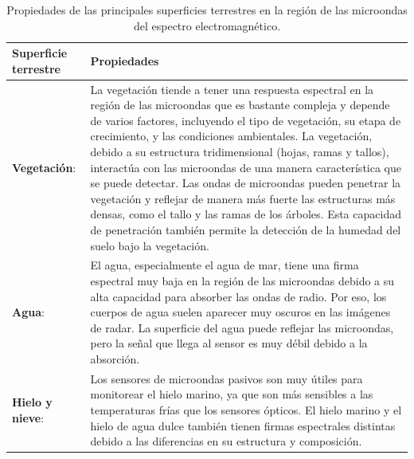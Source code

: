 \begin{table}[H]
    \caption{Propiedades de las principales superficies terrestres en la región de las microondas del espectro electromagnético.}
    \small
    \begin{tabularx}{1\textwidth}{lX}
        \hline
        \textbf{Superficie terrestre} & \textbf{Propiedades}                                                                                                                                                                                                                                                                                                                                                                                                                                                                                                                                                                                                                                                    \\ \hline
        \textbf{Vegetación}:          & La vegetación tiende a tener una respuesta espectral en la región de las microondas que es bastante compleja y depende de varios factores, incluyendo el tipo de vegetación, su etapa de crecimiento, y las condiciones ambientales. La vegetación, debido a su estructura tridimensional (hojas, ramas y tallos), interactúa con las microondas de una manera característica que se puede detectar. Las ondas de microondas pueden penetrar la vegetación y reflejar de manera más fuerte las estructuras más densas, como el tallo y las ramas de los árboles. Esta capacidad de penetración también permite la detección de la humedad del suelo bajo la vegetación.
        \\  \hline
        \textbf{Agua}:                & El agua, especialmente el agua de mar, tiene una firma espectral muy baja en la región de las microondas debido a su alta capacidad para absorber las ondas de radio. Por eso, los cuerpos de agua suelen aparecer muy oscuros en las imágenes de radar. La superficie del agua puede reflejar las microondas, pero la señal que llega al sensor es muy débil debido a la absorción.                                                                                                                                                                                                                                                                                    \\  \hline
        \textbf{Hielo y nieve}:       & Los sensores de microondas pasivos son muy útiles para monitorear el hielo marino, ya que son más sensibles a las temperaturas frías que los sensores ópticos. El hielo marino y el hielo de agua dulce también tienen firmas espectrales distintas debido a las diferencias en su estructura y composición.                                                                                                                                                                                                                                                                                                                                                            \\  \hline

\end{tabularx}
\end{table}
